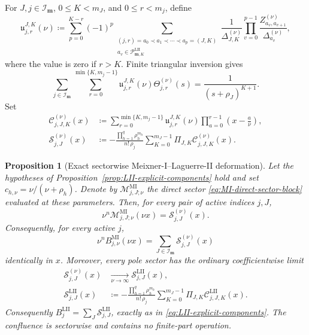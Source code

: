 \documentclass[10pt]{amsart}
\newcommand{\mm}{\boldsymbol m}
\theoremstyle{plain}
\newtheorem{proposition}[theorem]{Proposition}
\theoremstyle{definition}
\theoremstyle{remark}
\begin{document}
For \(J,j\in\mathcal I_{\mm}\), \(0\le K<m_J\), and
\(0\le r<m_j\), define
\begin{equation}
 \mathfrak u_{j,r}^{J,K}(\nu)
 \coloneq\sum_{p=0}^{K-r}(-1)^p
 \sum_{\substack{
 (j,r)=a_0\prec a_1\prec\cdots\prec a_p=(J,K)\\
 a_v\in\mathscr P_{\boldsymbol m,K}^{\mathrm{LII}}}}
 \frac1{\Delta_{J,K}^{(\nu)}}
 \prod_{v=0}^{p-1}
 \frac{Z_{a_v,a_{v+1}}^{(\nu)}}
      {\Delta_{a_v}^{(\nu)}} ,
 \label{eq:MI-LII-deformed-chain}
\end{equation}
where the value is zero if \(r>K\). Finite triangular inversion gives
\begin{equation}
 \sum_{j\in\mathcal I_{\mm}}
 \sum_{r=0}^{\min\{K,m_j-1\}}
 \mathfrak u_{j,r}^{J,K}(\nu)
 \Theta_{j,r}^{(\nu)}(s)
 =\frac1{(s+\rho_J)^{K+1}}.
 \label{eq:MI-LII-deformed-target}
\end{equation}
Set
\begin{align}
 \mathcal C_{j,J,K}^{(\nu)}(x)
 &\coloneq
 \sum_{r=0}^{\min\{K,m_j-1\}}
 \mathfrak u_{j,r}^{J,K}(\nu)
 \prod_{a=0}^{r-1}\left(x-\frac a\nu\right),
 \label{eq:MI-LII-deformed-component-block}\\
 \mathcal S_{j,J}^{(\nu)}(x)
 &\coloneq
 -\frac{\prod_{h=1}^q\rho_h^{m_h}}{n!\,\rho_j}
 \sum_{K=0}^{m_J-1}\Pi_{J,K}
 \mathcal C_{j,J,K}^{(\nu)}(x).
 \label{eq:MI-LII-deformed-sector}
\end{align}

\begin{proposition}[Exact sectorwise Meixner-I--Laguerre-II deformation]
\label{prop:MI-LII-exact-sectors}
Let the hypotheses of Proposition~\ref{prop:LII-explicit-components}
hold and set \(c_{h,\nu}=\nu/(\nu+\rho_h)\). Denote by
\(\mathscr M_{j,J;\nu}^{\mathrm{MI}}\) the direct sector
\eqref{eq:MI-direct-sector-block} evaluated at these parameters. Then,
for every pair of active indices \(j,J\),
\begin{equation}
 \nu^n\mathscr M_{j,J;\nu}^{\mathrm{MI}}(\nu x)
 =\mathcal S_{j,J}^{(\nu)}(x).
 \label{eq:MI-LII-exact-sector-identification}
\end{equation}
Consequently, for every active \(j\),
\begin{equation}
 \nu^n B_{j,\nu}^{\mathrm{MI}}(\nu x)
 =\sum_{J\in\mathcal I_{\mm}}\mathcal S_{j,J}^{(\nu)}(x)
 \label{eq:MI-LII-exact-sector-sum}
\end{equation}
identically in \(x\). Moreover, every pole sector has the ordinary
coefficientwise limit
\begin{align}
 \mathcal S_{j,J}^{(\nu)}(x)
 &\xrightarrow[\nu\to\infty]{}
 \mathcal S_{j,J}^{\mathrm{LII}}(x),
 \label{eq:MI-LII-sector-limit}\\
 \mathcal S_{j,J}^{\mathrm{LII}}(x)
 &\coloneq-\frac{\prod_{h=1}^q\rho_h^{m_h}}{n!\,\rho_j}
 \sum_{K=0}^{m_J-1}\Pi_{J,K}
 \mathcal C_{j,J,K}^{\mathrm{LII}}(x).
 \label{eq:LII-explicit-pole-sector}
\end{align}
Consequently
\(B_j^{\mathrm{LII}}=\sum_J\mathcal S_{j,J}^{\mathrm{LII}}\), exactly as
in \eqref{eq:LII-explicit-components}. The confluence is sectorwise and
contains no finite-part operation.
\end{proposition}
\end{document}
